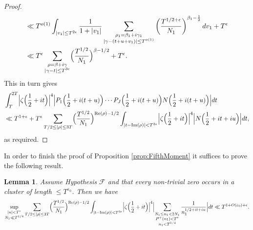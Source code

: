 \documentclass[12pt]{amsart}
\theoremstyle{plain}
\newtheorem{lemma}[theorem]{Lemma}
\theoremstyle{definition}
\theoremstyle{remark}
\begin{document}
\begin{proof}
\begin{align*}
&\ll T^{o(1)} \int_{|v_1| \leq T^{2\epsilon}} \frac{1}{1+|v_1|}\sum_{\substack{\rho_1 = \beta_1 + i\gamma_1 \\ |\gamma - (t+u+v_1)|\leq T^{o(1)}}} \left(\frac{T^{1/2+\epsilon}}{N_1} \right)^{\beta_1 - \frac{1}{2}}dv_1+ T^\epsilon \\
&\ll T^\epsilon \sum_{\substack{\rho = \beta+i\gamma \\ |\gamma - t| \leq T^{3\epsilon}}} \Bigl(\frac{T^{1/2}}{N_1}\Bigr)^{\beta-1/2} + T^\epsilon.
\end{align*}
This in turn gives
 \begin{align*}
&\int_T^{2T}\Bigl|\zeta\Bigl(\frac{1}{2}+it\Bigr)\Bigr|^4\Bigl|P_1\Bigl(\frac{1}{2}+i(t+u)\Bigr)\cdots P_J\Bigl(\frac{1}{2}+i(t+u)\Bigr)N\Bigl(\frac{1}{2}+i(t+u)\Bigr)\Bigr| dt\\
&\ll 
T^{1+\epsilon}+T^{\epsilon}\sum_{T/2\le |\rho|\le 3T}\Bigl(\frac{T^{1/2}}{N_1}\Bigr)^{\text{Re}(\rho)-1/2}\int_{|t-\text{Im}(\rho)|<T^{3\epsilon}}\Bigl|\zeta\Bigl(\frac{1}{2}+it\Bigr)\Bigr|^4 \Bigl|N\Bigl(\frac{1}{2}+it+iu\Bigr)\Bigr| dt,
\end{align*}
 as required.
 \end{proof}
%
%
%
In order to finish the proof of Proposition \ref{prop:FifthMoment} it suffices to prove the following result.
%
%
%
 \begin{lemma}
Assume Hypothesis $\mathcal{F}$ and that every non-trivial zero occurs in a cluster of length $\leq T^{\varepsilon_0}$. Then we have
 \[
 \sup_{\substack{|u|<T^{\epsilon}\\ N_1\ll T^{1/4}}}\sum_{T/2\le |\rho|\le 3T}\Bigl(\frac{T^{1/2}}{N_1}\Bigr)^{\textup{Re}(\rho)-1/2}\int_{|t-\textup{Im}(\rho)|<T^{3\epsilon}}\Bigl|\zeta\Bigl(\frac{1}{2}+it\Bigr)\Bigr|^4 \Bigl|\sum_{\substack{N_1\le n_1<2N_1\\ P^+(n_1)<T^\epsilon\\ n_1<T^{1/4}}}\frac{1}{n_1^{1/2+it+iu}}\Bigr| dt\ll T^{1+O(\varepsilon_0)+\epsilon}.
 \]
 \end{lemma} 
%
%
%
\end{document}
